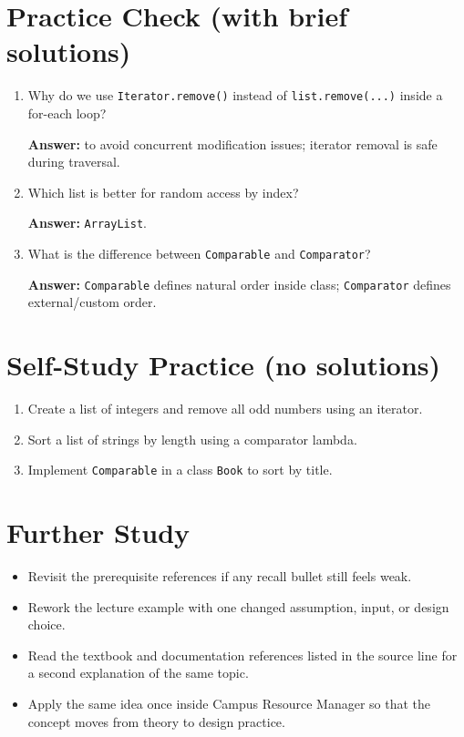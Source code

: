 \documentclass[11pt]{article}
\begin{document}
\section{Practice Check (with brief solutions)}
\begin{enumerate}
  \item Why do we use \texttt{Iterator.remove()} instead of \texttt{list.remove(...)} inside a for-each loop?\par
  \textbf{Answer:} to avoid concurrent modification issues; iterator removal is safe during traversal.

  \item Which list is better for random access by index?\par
  \textbf{Answer:} \texttt{ArrayList}.

  \item What is the difference between \texttt{Comparable} and \texttt{Comparator}?\par
  \textbf{Answer:} \texttt{Comparable} defines natural order inside class; \texttt{Comparator} defines external/custom order.
\end{enumerate}

\section{Self-Study Practice (no solutions)}
\begin{enumerate}
  \item Create a list of integers and remove all odd numbers using an iterator.
  \item Sort a list of strings by length using a comparator lambda.
  \item Implement \texttt{Comparable} in a class \texttt{Book} to sort by title.
\end{enumerate}

\section{Further Study}
\begin{itemize}
  \item Revisit the prerequisite references if any recall bullet still feels weak.
  \item Rework the lecture example with one changed assumption, input, or design choice.
  \item Read the textbook and documentation references listed in the source line for a second explanation of the same topic.
  \item Apply the same idea once inside Campus Resource Manager so that the concept moves from theory to design practice.
\end{itemize}
\notesources{\OOPSUnitVSources}
\end{document}
